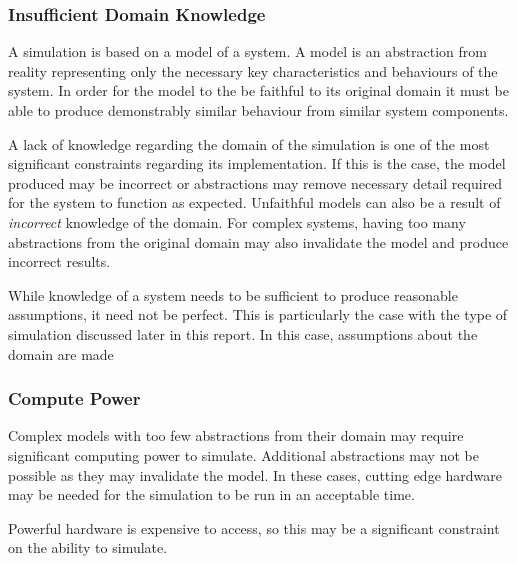 \documentclass{UoYCSproject}
\begin{document}
\subsubsection{Insufficient Domain Knowledge}
\label{domain_knowledge}
A simulation is based on a model of a system.
A model is an abstraction from reality representing only the necessary key characteristics and behaviours of the system.
In order for the model to the be faithful to its original domain it must be able to produce demonstrably similar behaviour from similar system components.

A lack of knowledge regarding the domain of the simulation is one of the most significant constraints regarding its implementation.
If this is the case, the model produced may be incorrect or abstractions may remove necessary detail required for the system to function as expected.
Unfaithful models can also be a result of \textit{incorrect} knowledge of the domain.
For complex systems, having too many abstractions from the original domain may also invalidate the model and produce incorrect results\cite[p.8]{cosmos}.

While knowledge of a system needs to be sufficient to produce reasonable assumptions, it need not be perfect.
This is particularly the case with the type of simulation discussed later in this report.
In this case, assumptions about the domain are made %

\subsubsection{Compute Power}
Complex models with too few abstractions from their domain may require significant computing power to simulate. Additional abstractions may not be possible as they may invalidate the model. In these cases, cutting edge hardware may be needed for the simulation to be run in an acceptable time. 


Powerful hardware is expensive to access, so this may be a significant constraint on the ability to simulate.


\end{document}
